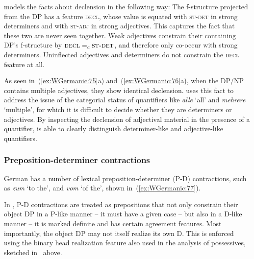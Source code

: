 \documentclass[output=paper,hidelinks]{langscibook}
\begin{document}
\citet{Dipper05} models the facts about declension in the
following way: The f-structure projected from the DP has a feature
\textsc{decl}, whose value
is equated with \textsc{st-det} in strong determiners and with \textsc{st-adj} in strong
adjectives.  This captures the fact that
these two are never seen together. Weak adjectives constrain their containing DP's f-structure by 
$\textsc{decl}=_{c}\textsc{st-det}$, and therefore
only co-occur with strong determiners. Uninflected adjectives and
determiners do not constrain the \textsc{decl} feature at all.

As seen in~(\ref{ex:WGermanic:75}a) and~(\ref{ex:WGermanic:76}a), when the DP/NP contains
multiple adjectives, they show identical declension. \citet{Dipper05}
uses this fact to address the issue of the categorial status of
quantifiers like \textit{alle} `all' and \textit{mehrere} `multiple',
for which it is difficult to decide whether they are determiners or
adjectives. By inspecting the declension of adjectival material in the
presence of a quantifier, \citeauthor{Dipper05} is able to clearly
distinguish determiner-like and adjective-like quantifiers.



\subsubsection{Preposition-determiner contractions}

German has a number of lexical preposition-determiner (P-D) contractions, such as \textit{zum} `to the', and \textit{vom} `of the', shown in~(\ref{ex:WGermanic:77}). 
%
\begin{exe}
  \ex\label{ex:WGermanic:77}
  \begin{xlist}
  \end{xlist}
\end{exe}
%
In \citet{berman-frank:1996}, P-D contractions are treated as
prepositions that not only constrain their object DP in a P-like manner -- it
must have a given case -- but also in a D-like manner -- it is marked
definite and has certain agreement features. Most importantly, the
object DP may not itself realize its own D. This is enforced using the
binary head realization feature also used in the analysis of possessives,
sketched in~ above.
\end{document}
